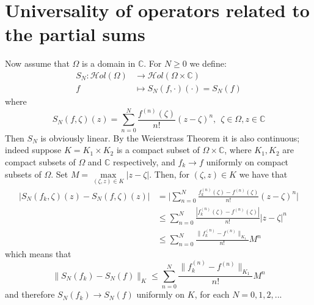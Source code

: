 \documentclass[11pt,twoside,a4paper]{article}
\theoremstyle{remark}
\newcommand{\hol}{{\mathcal Hol}}
\newcommand{\holo}{{\mathcal Hol}(\Omega)}
\begin{document}
\section{Universality of operators related to the partial sums}



Now assume that $\Omega$ is a domain in $\mathbb{C}$. For $N \geq 0$ we define:
\begin{align*}
 S_N: \holo & \rightarrow \hol(\Omega \times \mathbb{C}) \\
 f & \mapsto S_N(f, \cdot)(\cdot)= S_N(f)
\end{align*}
where
\begin{equation*}
  S_N(f,\zeta)(z)= \sum_{n=0}^{N}\frac{f^{(n)}(\zeta)}{n!}(z- \zeta)^n, \hspace{5pt} \zeta \in \Omega, z\in \mathbb{C}
\end{equation*}
Then $S_N$ is obviously linear. By the Weierstrass Theorem it is also continuous; indeed suppose $K=K_1 \times K_2$ is a compact subset of $\Omega \times \mathbb{C}$, where $K_1, K_2$ are compact subsets of $\Omega$ and $\mathbb{C}$ respectively, and $f_k \longrightarrow f$ uniformly on compact subsets of $\Omega$. Set $M = \max\limits_{(\zeta,z)\in K}|z- \zeta|$. Then, for $(\zeta,z) \in K$ we have that
\begin{align*}
  | S_N(f_k,\zeta)(z)-S_N(f,\zeta)(z) |&= \Big|\sum_{n=0}^{N}\frac{f_k^{(n)}(\zeta)-f^{(n)}(\zeta)}{n!}(z-\zeta)^n \Big|\\
  & \leq \sum_{n=0}^{N}\frac{|f_k^{(n)}(\zeta)-f^{(n)}(\zeta)|}{n!}|z-\zeta|^n \\
  & \leq \sum_{n=0}^{N} \frac{\|f_k^{(n)}-f^{(n)}\|_{K_1}}{n!}M^n
\end{align*}
 which means that
 \begin{equation*}
   \|S_N(f_k)-S_N(f)\|_{K} \leq \sum_{n=0}^{N} \frac{\|f_k^{(n)}-f^{(n)}\|_{K_1}}{n!}M^n
 \end{equation*}
  and therefore $S_N(f_k) \longrightarrow S_N(f)$ uniformly on $K$, for each $N=0,1,2,...$
\end{document}
